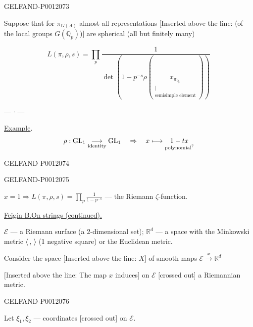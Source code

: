 \begin{GelfandAdjacentEvidence}{GELFAND-P001207}{3}


Suppose that for \(\pi_{G(A)}\) almost all representations
[Inserted above the line: (of the local groups \(G(\mathbb Q_p)\))] are spherical
(all but finitely many)

\[
L(\pi,\rho,s)=\prod_p
\frac{1}{\det\left(1-p^{-s}\rho\left(
\underset{\substack{\vert\\\text{semisimple element}}}{x_{\pi_{\mathbb Q_p}}}
\right)\right)}
\]

\begin{center}--- \(\cdot\) ---\end{center}

\underline{Example}.
\[
\rho:\mathrm{GL}_1\underset{\text{identity}}{\longrightarrow}\mathrm{GL}_1
\quad\Rightarrow\quad
x\longmapsto\underset{\text{polynomial\textsuperscript{?}}}{1-tx}
\]
\end{GelfandAdjacentEvidence}
\begin{GelfandAdjacentEvidence}{GELFAND-P001207}{4}

\end{GelfandAdjacentEvidence}
\begin{GelfandAdjacentEvidence}{GELFAND-P001207}{5}


\(x=1\Rightarrow L(\pi,\rho,s)=\prod_p\frac{1}{1-p^{-s}}\)
--- the Riemann \(\zeta\)-function.

\underline{\underline{Feigin B.}}\qquad\underline{On strings (continued).}

\(\mathcal E\) --- a Riemann surface (a 2-dimensional set);
\(\mathbb R^d\) --- a space with the Minkowski metric
\(\langle\, , \,\rangle\) (1 negative square) or the Euclidean metric.

Consider the space [Inserted above the line: \(X\)] of smooth maps
\(\mathcal E\overset{x}{\longrightarrow}\mathbb R^d\)

[Inserted above the line: The map \(x\) induces]
on \(\mathcal E\) [crossed out] a Riemannian metric.
\end{GelfandAdjacentEvidence}
\begin{GelfandAdjacentEvidence}{GELFAND-P001207}{6}


Let \(\xi_1,\xi_2\) --- coordinates [crossed out] on \(\mathcal E\).
\end{GelfandAdjacentEvidence}

